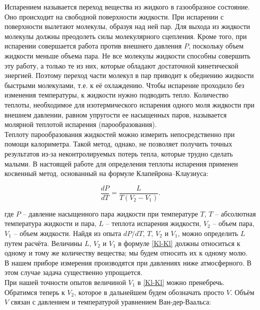 \documentclass[a4paper, 12pt]{article}
\begin{document}
    \noindent Испарением называется переход вещества из жидкого в газообразное состояние. Оно происходит на свободной поверхности жидкости. При испарении с поверхности вылетают молекулы, образуя над ней пар. Для выхода из жидкости молекулы должны преодолеть силы молекулярного сцепления. Кроме того, при испарении совершается работа против внешнего давления $P$, поскольку объем жидкости меньше объема пара. Не все молекулы жидкости способны совершить эту работу, а только те из них, которые обладают достаточной кинетической энергией. Поэтому переход части молекул в пар приводит к обеднению жидкости быстрыми молекулами, т.е. к её охлаждению. Чтобы испарение проходило без изменения температуры, к жидкости нужно подводить тепло. Количество теплоты, необходимое для изотермического испарения одного моля жидкости при внешнем давлении, равном упругости ее насыщенных паров, называется молярной теплотой испарения (парообразования). \\

    \noindent Теплоту парообразования жидкостей можно измерить непосредственно при помощи калориметра. Такой метод, однако, не позволяет получить точных результатов из-за неконтролируемых потерь тепла, которые трудно сделать малыми. В настоящей работе для определения теплоты испарения применен косвенный метод, основанный на формуле Клапейрона–Клаузиуса:

    \begin{equation}
        \label{Kl-Kl}
        \frac{dP}{dT}=\frac{L}{T\left(V_2-V_1\right)}.
    \end{equation}

    \noindent где $P$ -- давление насыщенного пара жидкости при температуре $T$, $T$ -- абсолютная температура жидкости и пара, $L$ -- теплота испарения жидкости, $V_2$ -- объем пара, $V_1$ -- объем жидкости. Найдя из опыта $dP/dT$, $T$, $V_2$ и $V_1$, можно определить $L$ путем расчёта. Величины $L$, $V_2$ и $V_1$ в формуле \eqref{Kl-Kl} должны относиться к одному и тому же количеству вещества; мы будем относить их к одному молю. \\

    \noindent В нашем приборе измерения производятся при давлениях ниже атмосферного. В этом случае задача существенно упрощается. \\

    \noindent При нашей точности опытов величиной $V_1$ в \eqref{Kl-Kl} можно пренебречь. \\

    \noindent Обратимся теперь к $V_2$, которое в дальнейшем будем обозначать просто $V$. Объём $V$ связан с давлением и температурой уравнением Ван-дер-Ваальса:
\end{document}
